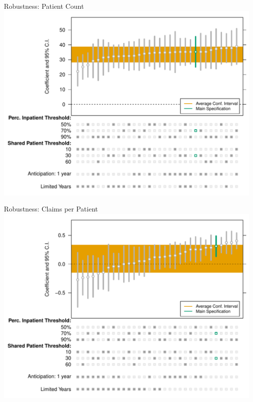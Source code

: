 \documentclass[notes,11pt, aspectratio=169]{beamer}
\begin{document}
\begin{frame}[noframenumbering]{Robustness: Patient Count}
\label{Robustness: Patient Count}
\centering
    \includegraphics[scale=.45]{Objects/patient_chart.pdf}
    \hyperlink{Effect of EHR Exposure on Patient Count}{}
\end{frame}

\begin{frame}[noframenumbering]{Robustness: Claims per Patient}
\label{Robustness: Claims per Patient}
\centering
    \includegraphics[scale=.45]{Objects/claim_chart.pdf}
    \hyperlink{Effect of EHR Exposure on Claims per Patient}{}
\end{frame}
\end{document}
